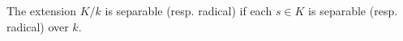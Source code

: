 The extension $K/k$ is separable (resp. radical) if each $s \in K$ is separable (resp. radical) over $k$.
